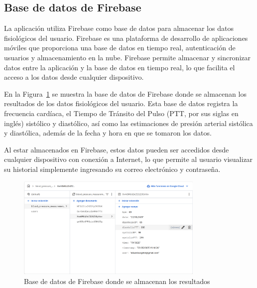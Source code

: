     \subsection{Base de datos de Firebase}
    La aplicación utiliza Firebase como base de datos para almacenar los datos fisiológicos del usuario. Firebase es una plataforma de desarrollo de aplicaciones móviles que proporciona una base de datos en tiempo real, autenticación de usuarios y almacenamiento en la nube. Firebase permite almacenar y sincronizar datos entre la aplicación y la base de datos en tiempo real, lo que facilita el acceso a los datos desde cualquier dispositivo.

    En la Figura~\ref{fig:Firebase_BD_Resultados} se muestra la base de datos de Firebase donde se almacenan los resultados de los datos fisiológicos del usuario. Esta base de datos registra la frecuencia cardíaca, el Tiempo de Tránsito del Pulso (PTT, por sus siglas en inglés) sistólico y diastólico, así como las estimaciones de presión arterial sistólica y diastólica, además de la fecha y hora en que se tomaron los datos.

    Al estar almacenados en Firebase, estos datos pueden ser accedidos desde cualquier dispositivo con conexión a Internet, lo que permite al usuario visualizar su historial simplemente ingresando su correo electrónico y contraseña.

    \begin{figure}[H]
        \centering
        \includegraphics[width=0.8\textwidth]{img/Resultados/firebase_BD_resultados.png}
        \caption[Base de datos de Firebase donde se almacenan los resultados.]{Base de datos de Firebase donde se almacenan los resultados\footnotemark}
        \label{fig:Firebase_BD_Resultados}
    \end{figure}

